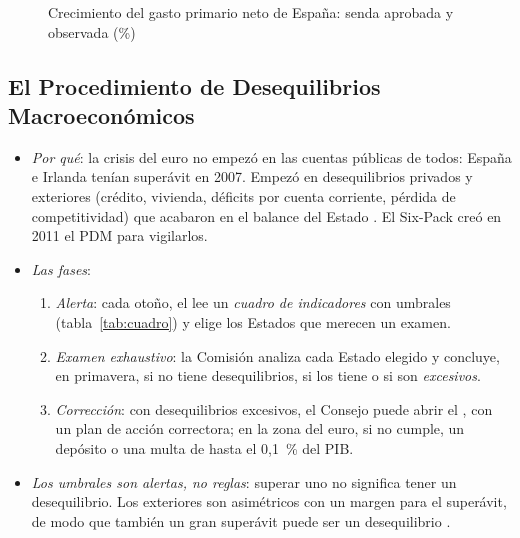 \documentclass[11pt]{article}
\begin{document}
\begin{figure}[H]
\centering
\caption{Crecimiento del gasto primario neto de España: senda aprobada y observada (\%)}\label{fig:gasto-neto}
\end{figure}

\subsection{El Procedimiento de Desequilibrios Macroeconómicos}\label{sec:pdm}

\begin{itemize}
\item \emph{Por qué}: la crisis del euro no empezó en las cuentas públicas de todos: España e Irlanda tenían superávit en 2007. Empezó en desequilibrios privados y exteriores (crédito, vivienda, déficits por cuenta corriente, pérdida de competitividad) que acabaron en el balance del Estado . El Six-Pack creó en 2011 el PDM para vigilarlos\nocite{UE2011Reglamento1176,UE2011Reglamento1174}.
\item \emph{Las fases}:
  \begin{enumerate}
  \item \emph{Alerta}: cada otoño, el  lee un \emph{cuadro de indicadores} con umbrales (tabla~\ref{tab:cuadro}) y elige los Estados que merecen un examen.
  \item \emph{Examen exhaustivo}: la Comisión analiza cada Estado elegido y concluye, en primavera, si no tiene desequilibrios, si los tiene o si son \emph{excesivos}.
  \item \emph{Corrección}: con desequilibrios excesivos, el Consejo puede abrir el , con un plan de acción correctora; en la zona del euro, si no cumple, un depósito o una multa de hasta el 0,1~\% del PIB.
  \end{enumerate}
\item \emph{Los umbrales son alertas, no reglas}: superar uno no significa tener un desequilibrio. Los exteriores son asimétricos con un margen para el superávit, de modo que también un gran superávit puede ser un desequilibrio .
\end{itemize}
\end{document}

